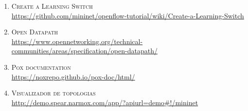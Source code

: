 	\begin{enumerate}
		\item \textsc{Create a Learning Switch}\\
		\href{https://github.com/mininet/openflow-tutorial/wiki/Create-a-Learning-Switch}
		{https://github.com/mininet/openflow-tutorial/wiki/Create-a-Learning-Switch}
		\item \textsc{Open Datapath}\\
		\href{https://www.opennetworking.org/technical-communities/areas/specification/open-datapath/}
		{https://www.opennetworking.org/technical-communities/areas/specification/open-datapath/}
		\item \textsc{Pox documentation}\\
		\href{https://noxrepo.github.io/pox-doc/html/}
		{https://noxrepo.github.io/pox-doc/html/}
		\item \textsc{Visualizador de topologias}\\
		\href{http://demo.spear.narmox.com/app/?apiurl=demo#!/mininet}
		{http://demo.spear.narmox.com/app/?apiurl=demo\#!/mininet}
	\end{enumerate}
